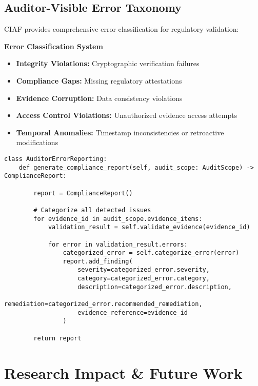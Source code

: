 \documentclass[12pt,a4paper]{article}
\begin{document}
\subsection{Auditor-Visible Error Taxonomy}

CIAF provides comprehensive error classification for regulatory validation:

\begin{technicalbox}
\textbf{Error Classification System}
\begin{itemize}
\item \textbf{Integrity Violations:} Cryptographic verification failures
\item \textbf{Compliance Gaps:} Missing regulatory attestations
\item \textbf{Evidence Corruption:} Data consistency violations
\item \textbf{Access Control Violations:} Unauthorized evidence access attempts
\item \textbf{Temporal Anomalies:} Timestamp inconsistencies or retroactive modifications
\end{itemize}
\end{technicalbox}

\begin{lstlisting}[caption=Error Taxonomy Implementation]
class AuditorErrorReporting:
    def generate_compliance_report(self, audit_scope: AuditScope) -> ComplianceReport:

        report = ComplianceReport()
        
        # Categorize all detected issues
        for evidence_id in audit_scope.evidence_items:
            validation_result = self.validate_evidence(evidence_id)
            
            for error in validation_result.errors:
                categorized_error = self.categorize_error(error)
                report.add_finding(
                    severity=categorized_error.severity,
                    category=categorized_error.category,
                    description=categorized_error.description,
                    remediation=categorized_error.recommended_remediation,
                    evidence_reference=evidence_id
                )
        
        return report
\end{lstlisting}

\section{Research Impact \& Future Work}
\end{document}
